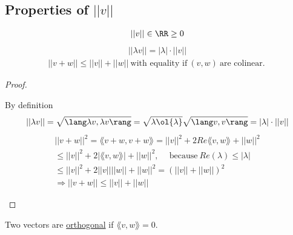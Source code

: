 \documentclass[class=scrartcl, crop=false]{standalone}
\begin{document}
\subsection{Properties of $||v||$}
\begin{enumerate}
  \ii
  \begin{gather*}
    ||v|| \in \RR \geq 0
  \end{gather*} 
  \ii
  \begin{gather*}
    ||\lambda v|| = |\lambda| \cdot ||v||
  \end{gather*} 
  \ii
  \begin{gather*}
    ||v + w || \leq ||v|| + ||w|| \ \text{with equality if} \ (v, w) \ \text{are colinear.} \ 
  \end{gather*} 
\end{enumerate} 
\begin{proof}
  \begin{enumerate}
    \ii[]
    \ii
    By definition
    \ii
    \begin{gather*}
      ||\lambda v || = \sqrt{\lang \lambda v, \lambda v \rang} = \sqrt{\lambda \ol{\lambda}}\sqrt{\lang v, v \rang} = |\lambda| \cdot ||v||
    \end{gather*} 
    \ii %
    \begin{gather*}
      ||v + w||^2 = \lang v + w, v + w \rang = ||v||^2 + 2Re \lang v, w \rang + ||w||^2 \\
      \leq ||v||^2 + 2|\lang v, w \rang | + ||w||^2, \quad \ \text{because} \ Re(\lambda) \leq |\lambda| \\
      \leq ||v||^2 + 2||v||||w|| + ||w||^2 = (||v|| + ||w||)^2 \\
      \Rightarrow ||v + w|| \leq ||v|| + ||w||
    \end{gather*} 
  \end{enumerate} 
\end{proof} 

\begin{definition}[Orthogonality]
  Two vectors are \ul{orthogonal} if $\lang v, w \rang = 0$.
\end{definition} 
\end{document}

